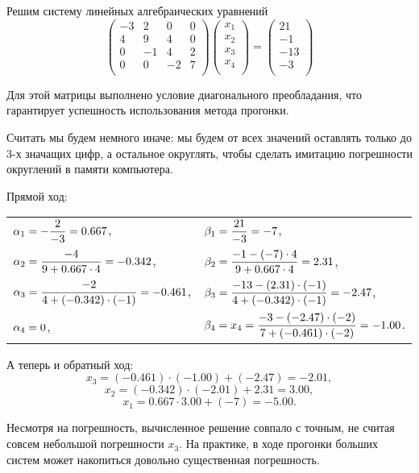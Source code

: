 \documentclass{article}
\begin{document}
\begin{example}
	Решим систему линейных алгебраических уравнений
	\[
		\begin{pmatrix}
			-3	& 2	& 0	& 0	\\
			4	& 9	& 4	& 0	\\
			0	& -1	& 4	& 2	\\
			0	& 0	& -2	& 7	\\
		\end{pmatrix}
		\begin{pmatrix}
			x_1 \\
			x_2 \\
			x_3 \\
			x_4 \\
		\end{pmatrix}
		=
		\begin{pmatrix}
			21  \\
			-1  \\
			-13 \\
			-3  \\
		\end{pmatrix}
	\]

	Для этой матрицы выполнено условие диагонального преобладания, что
	гарантирует успешность использования метода прогонки.

	Считать мы будем немного иначе: мы будем от всех значений оставлять
	только до 3-х значащих цифр, а остальное округлять, чтобы сделать
	имитацию погрешности округлений в памяти компьютера.

	Прямой ход:

	\begin{tabular}{*{2}{l}}
		\vspace{4mm}
		$\mathlarger{\alpha_1=-\frac{2}{-3}=0.667}$, &
			$\mathlarger{\beta_1=\frac{21}{-3}=-7}$, \\
		\vspace{4mm}
		$\mathlarger{\alpha_2=\frac{-4}{9+0.667\cdot 4}}=-0.342$, &
			$\mathlarger{\beta_2=\frac{-1-(-7)\cdot 4}{9+0.667\cdot 4}=
			2.31}$, \\
		\vspace{4mm}
		$\mathlarger{\alpha_3=\frac{-2}{4+(-0.342)\cdot (-1)}}=-0.461$, &
			$\mathlarger{\beta_3=\frac{-13-(2.31)\cdot (-1)}
			{4+(-0.342)\cdot (-1)}=-2.47}$, \\
		$\mathlarger{\alpha_4=0}$, &
			$\mathlarger{\beta_4=x_4=\frac{-3-(-2.47)\cdot (-2)}
			{7+(-0.461)\cdot (-2)}=-1.00}$. \\
	\end{tabular}

	А теперь и обратный ход:
	\[x_3=(-0.461)\cdot (-1.00)+(-2.47)=-2.01,\]
	\[x_2=(-0.342)\cdot (-2.01)+2.31=3.00,\]
	\[x_1=0.667\cdot 3.00+(-7)=-5.00.\]

	Несмотря на погрешность, вычисленное решение совпало с точным, не считая
	совсем небольшой погрешности $x_3$. На практике, в ходе прогонки больших
	систем может накопиться довольно существенная погрешность.
\end{example}
\end{document}
